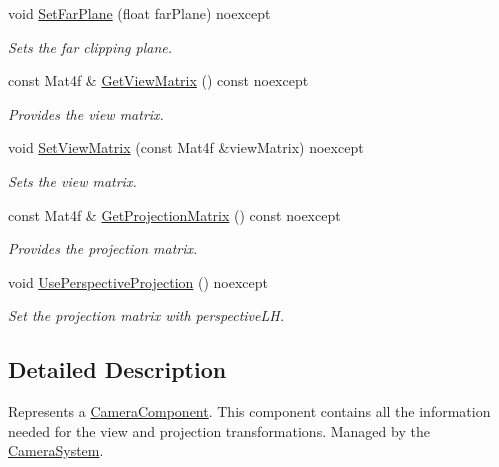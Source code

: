 \begin{DoxyCompactItemize}
void \hyperlink{class_blade_1_1_camera_component_a431e7ecb3e2c4302cb1d07c07cb89dc4}{Set\+Far\+Plane} (float far\+Plane) noexcept
\begin{DoxyCompactList}\small\item\em Sets the far clipping plane. \end{DoxyCompactList}\item 
const Mat4f \& \hyperlink{class_blade_1_1_camera_component_a5b8dbf3a13f82da25a0f21d21d92fd99}{Get\+View\+Matrix} () const noexcept
\begin{DoxyCompactList}\small\item\em Provides the view matrix. \end{DoxyCompactList}\item 
void \hyperlink{class_blade_1_1_camera_component_ad1972814c236509dd7fcc9525e068e46}{Set\+View\+Matrix} (const Mat4f \&view\+Matrix) noexcept
\begin{DoxyCompactList}\small\item\em Sets the view matrix. \end{DoxyCompactList}\item 
const Mat4f \& \hyperlink{class_blade_1_1_camera_component_a5d79b698eb708d55538f9b8c045368c6}{Get\+Projection\+Matrix} () const noexcept
\begin{DoxyCompactList}\small\item\em Provides the projection matrix. \end{DoxyCompactList}\item 
\mbox{\label{class_blade_1_1_camera_component_a4e8109fb88659b5e08f71ccc3a176fa4}} 
void \hyperlink{class_blade_1_1_camera_component_a4e8109fb88659b5e08f71ccc3a176fa4}{Use\+Perspective\+Projection} () noexcept
\begin{DoxyCompactList}\small\item\em Set the projection matrix with perspective\+LH. \end{DoxyCompactList}\end{DoxyCompactItemize}


\subsection{Detailed Description}
Represents a \hyperlink{class_blade_1_1_camera_component}{Camera\+Component}. This component contains all the information needed for the view and projection transformations. Managed by the \hyperlink{class_blade_1_1_camera_system}{Camera\+System}. 

